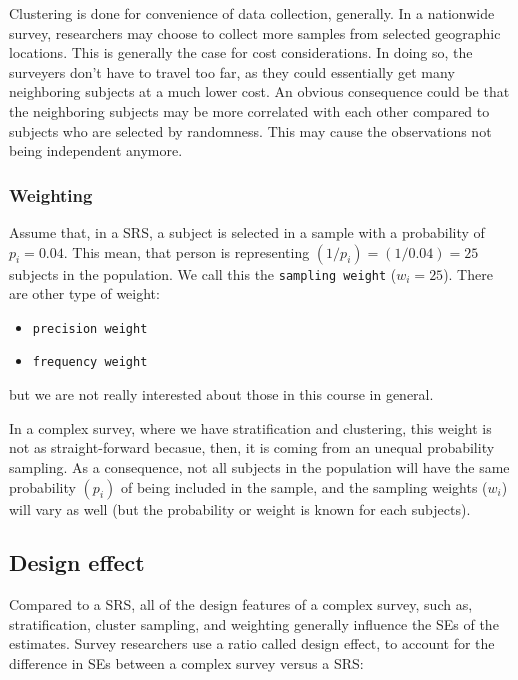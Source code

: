 \documentclass[
]{book}
\providecommand{\tightlist}{%
  \setlength{\itemsep}{0pt}\setlength{\parskip}{0pt}}
\begin{document}
Clustering is done for convenience of data collection, generally. In a nationwide survey, researchers may choose to collect more samples from selected geographic locations. This is generally the case for cost considerations. In doing so, the surveyers don't have to travel too far, as they could essentially get many neighboring subjects at a much lower cost. An obvious consequence could be that the neighboring subjects may be more correlated with each other compared to subjects who are selected by randomness. This may cause the observations not being independent anymore.

\hypertarget{weighting}{%
\subsubsection{Weighting}\label{weighting}}

Assume that, in a SRS, a subject is selected in a sample with a probability of \(p_i = 0.04\). This mean, that person is representing \((1/p_i) = (1/0.04) = 25\) subjects in the population. We call this the \texttt{sampling\ weight} (\(w_i = 25\)). There are other type of weight:

\begin{itemize}
\tightlist
\item
  \texttt{precision\ weight}
\item
  \texttt{frequency\ weight}
\end{itemize}

but we are not really interested about those in this course in general.

In a complex survey, where we have stratification and clustering, this weight is not as straight-forward becasue, then, it is coming from an unequal probability sampling. As a consequence, not all subjects in the population will have the same probability \((p_i)\) of being included in the sample, and the sampling weights (\(w_i\)) will vary as well (but the probability or weight is known for each subjects).

\hypertarget{design-effect}{%
\subsection{Design effect}\label{design-effect}}

Compared to a SRS, all of the design features of a complex survey, such as, stratification, cluster sampling, and weighting generally influence the SEs of the estimates. Survey researchers use a ratio called design effect, to account for the difference in SEs between a complex survey versus a SRS:
\end{document}
